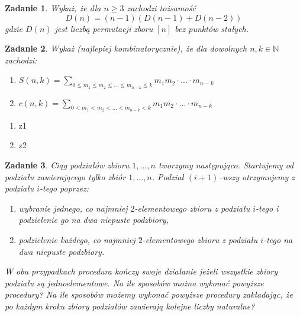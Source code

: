 \documentclass{mwbk}
\newtheorem{zad}{Zadanie}[chapter]
\begin{document}
\begin{zad}
    Wykaż, że dla $n \geq 3$ zachodzi tożsamość
    \[
        D(n) = (n-1)(D(n-1) + D(n-2))
    \]
    gdzie $D(n)$ jest liczbą permutacji zboru $[n]$ bez punktów stałych.
\end{zad}
\begin{mdframed}

\end{mdframed}




\begin{zad}
    Wykaż (najlepiej kombinatorycznie), że dla dowolnych $n, k \in \mathbb{N}$
    zachodzi:
    \begin{enumerate}
        \item $S(n, k) = \sum_{0 \leq m_1 \leq m_2 \leq ... \leq m_{n-k} \leq k} m_1m_2 \cdot ... \cdot m_{n-k}$
        \item $c(n, k) = \sum_{0 < m_1 < m_2 < ... < m_{n-k} < k} m_1m_2 \cdot ... \cdot m_{n-k}$
    \end{enumerate}
\end{zad}
\begin{enumerate}
    \item z1
    \item z2
\end{enumerate}



\begin{zad}
    Ciąg podziałów zbioru ${1, ..., n}$ tworzymy następująco. Startujemy
    od podziału zawierającego tylko zbiór ${1, ..., n}$. Podział $(i + 1)$--wszy
    otrzymujemy z podziału $i$-tego poprzez:
    \begin{enumerate}
        \item wybranie jednego, co najmniej $2$-elementowego zbioru z podziału $i$-tego i podzielenie
              go na dwa niepuste podzbiory,
        \item podzielenie każdego, co najmniej $2$-elementowego zbioru z podziału $i$-tego na dwa
              niepuste podzbiory.
    \end{enumerate}
    W obu przypadkach procedura kończy swoje działanie jeżeli wszystkie zbiory podziału są
    jednoelementowe. Na ile sposobów można wykonać powyższe procedury? Na ile sposobów
    możemy wykonać powyższe procedury zakładając, że po każdym kroku zbiory podziałów
    zawierają kolejne liczby naturalne?
\end{zad}
\begin{mdframed}

\end{mdframed}
\end{document}
